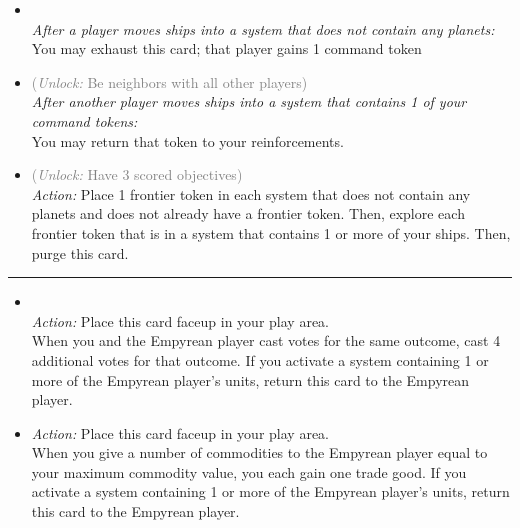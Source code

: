 \begin{multicols}{2}
\begin{itemize}
\item {}\\
\emph{After a player moves ships into a system that does not contain any planets:}
\\
You may exhaust this card; that player gains 1 command token 
\item {} \textcolor{gray}{(\emph{Unlock:} Be neighbors with all other players)}\\
\emph{After another player moves ships into a system that contains 1 of your command tokens:}
\\
You may return that token to your reinforcements.
\item {} \textcolor{gray}{(\emph{Unlock:} Have 3 scored objectives)}\\
\emph{Action:} Place 1 frontier token in each system that does not contain any planets and does not already have a frontier token. Then, explore each frontier token that is in a system that contains 1 or more of your ships. Then, purge this card.
\end{itemize}

\vspace{-10pt}\rule{\hsize}{0.4pt}\vspace{5pt}


\begin{itemize}
\item {}\\
\emph{Action:} Place this card faceup in your play area.\\
When you and the Empyrean player cast votes for the same outcome, cast 4 additional votes for that outcome. If you activate a system containing 1 or more of the Empyrean player's units, return this card to the Empyrean player.
\item {}
\emph{Action:} Place this card faceup in your play area.\\
When you give a number of commodities to the Empyrean player equal to your maximum commodity value, you each gain one trade good. If you activate a system containing 1 or more of the Empyrean player's units, return this card to the Empyrean player.
\end{itemize}

\end{multicols}



